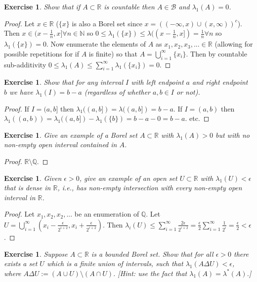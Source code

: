 \documentclass{article}
\newtheorem{exercise}[theorem]{Exercise}
\begin{document}
\begin{exercise}
Show that if $A \subset \mathbb{R}$ is countable then $A \in \mathcal{B}$ and $\lambda_1(A) = 0$.
\end{exercise}
\begin{proof}
Let $x\in\mathbb{R}$ ($\{x\}$ is also a Borel set since $x=((-\infty,x)\cup(x,\infty))^c$). Then $x\in(x-\frac{1}{n},x]\forall n\in\mathbb{N}$ so $0\leq\lambda_1(\{x\})\leq \lambda((x-\frac{1}{n},x])=\frac{1}{n}\forall n$ so $\lambda_1(\{x\})=0$. Now enumerate the elements of $A$ as $x_1,x_2,x_3,...\in\mathbb{R}$ (allowing for possible repetitions for if $A$ is finite) so that $A=\bigcup_{i=1}^\infty\{x_i\}$. Then by countable sub-additivity $0\leq\lambda_1(A)\leq\sum_{i=1}^\infty\lambda_1(\{x_i\})=0$.
\end{proof}
\begin{exercise}
    Show that for any interval $I$ with left endpoint $a$ and right endpoint $b$ we have $\lambda_1(I) = b - a$ (regardless of whether $a, b \in I$ or not).
\end{exercise}
\begin{proof}
If $I=(a,b]$ then $\lambda_1((a,b])=\lambda((a,b])=b-a$.
If $I=(a,b)$ then $\lambda_1((a,b))=\lambda_1((a,b])-\lambda_1(\{b\})=b-a-0=b-a$.
etc.
\end{proof}
\begin{exercise}
    Give an example of a Borel set $A \subset \mathbb{R}$ with $\lambda_1(A) > 0$ but with no non-empty open interval contained in $A$.
\end{exercise}
\begin{proof}
$\mathbb{R}\setminus\mathbb{Q}$.
\end{proof}
\begin{exercise}
    Given $\epsilon > 0$, give an example of an open set $U \subset \mathbb{R}$ with $\lambda_1(U) < \epsilon$ that is dense in $\mathbb{R}$, i.e., has non-empty intersection with every non-empty open interval in $\mathbb{R}$.
\end{exercise}
\begin{proof}
Let $x_1,x_2,x_2,...$ be an enumeration of $\mathbb{Q}$. Let $U=\bigcup_{i=1}^\infty(x_i-\frac{\epsilon}{2^{i+2}},x_i+\frac{\epsilon}{2^{i+2}})$. Then $\lambda_i(U)\leq\sum_{i=1}^\infty\frac{2\epsilon}{2^{i+2}}=\frac{\epsilon}{2}\sum_{i=1}^\infty\frac{1}{2^i}=\frac{\epsilon}{2}<\epsilon$.
\end{proof}
\begin{exercise}
    Suppose $A \subset \mathbb{R}$ is a bounded Borel set. Show that for all $\epsilon > 0$ there exists a set $U$ which is a finite union of intervals, such that $\lambda_1(A \Delta U) < \epsilon$, where $A \Delta U := (A \cup U) \setminus (A \cap U)$. 
    [\textit{Hint: use the fact that $\lambda_1(A) = \lambda^*(A)$.}]
\end{exercise}
\end{document}
